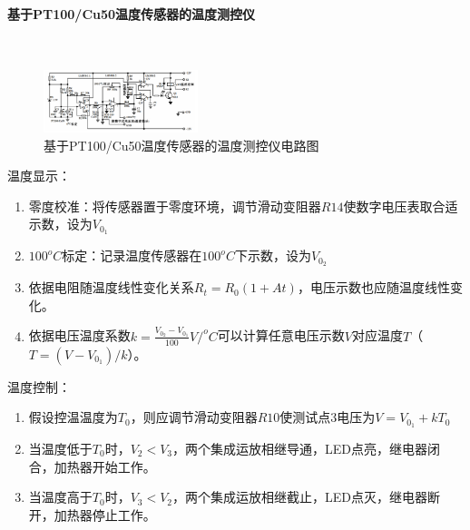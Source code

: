 \documentclass[12pt,a4paper,UTF8]{ctexart}
\begin{document}
    \paragraph{基于PT100/Cu50温度传感器的温度测控仪}~
    \newline
    \indent
    \begin{figure}[htbp]
        \centering
        \includegraphics[width=0.4\textwidth]{attachments/illus-3.png}
        \caption{基于PT100/Cu50温度传感器的温度测控仪电路图}
        \label{fig:illus-3}
    \end{figure}
    温度显示：
    \begin{enumerate}[label=\arabic*.]
		\item 零度校准：将传感器置于零度环境，调节滑动变阻器$R14$使数字电压表取合适示数，设为$V_{0_1}$
		\item $100^oC$标定：记录温度传感器在$100^oC$下示数，设为$V_{0_2}$
		\item 依据电阻随温度线性变化关系$R_t = R_0(1+At)$，电压示数也应随温度线性变化。
        \item 依据电压温度系数$k = \frac{V_{0_2} - V_{0_1}}{100} V/^oC$可以计算任意电压示数$V$对应温度$T$（$T = (V - V_{0_1})/k$）。
	\end{enumerate}
    温度控制：
    \begin{enumerate}[label=\arabic*.]
		\item 假设控温温度为$T_0$，则应调节滑动变阻器$R10$使测试点3电压为$V = V_{0_1} + kT_0$
		\item 当温度低于$T_0$时，$V_2 < V_3$，两个集成运放相继导通，LED点亮，继电器闭合，加热器开始工作。
        \item 当温度高于$T_0$时，$V_3 < V_2$，两个集成运放相继截止，LED点灭，继电器断开，加热器停止工作。
	\end{enumerate}
\end{document}
